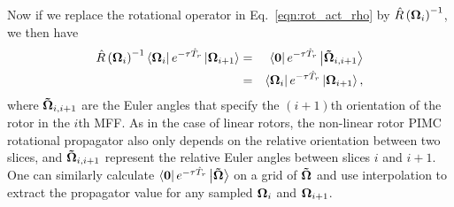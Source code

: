 \documentclass[12pt]{iopart}
\begin{document}
Now if we replace the rotational operator in Eq.~\ref{eqn:rot_act_rho} by $\hat{R}\left({{\bf \Omega}_i}\right)^{-1}$, we then  have
\begin{eqnarray}
\hat{R}\left({{\bf \Omega}_i}\right)^{-1}\left<{\bf \Omega}_i\right| e^{ -\tau\hat{T}_r }\left| {\bf \Omega}_{i+1} \right>&=&\left<{\bf 0}\right| e^{ -\tau\hat{T}_r }\left| {\bf \tilde{\Omega}}_{i,i+1} \right>\nonumber\\
&=&\left<{\bf \Omega}_i\right| e^{ -\tau\hat{T}_r }\left| {\bf \Omega}_{i+1} \right>,
\end{eqnarray}
where ${\bf \tilde{\Omega}}_{i,i+1}$ are the Euler angles that specify the $\left(i+1\right)$th orientation of the rotor in the $i$th MFF. 
As in the case of linear rotors, the non-linear rotor PIMC rotational propagator also only depends on the relative orientation between two slices, and ${\bf \tilde{\Omega}}_{i,i+1}$ represent the relative Euler angles between slices $i$ and $i+1$. One can similarly calculate
$\left<{\bf 0}\right| e^{ -\tau\hat{T}_r }\left| {\bf \tilde{\Omega}} \right>$
on a grid of ${\bf \tilde{\Omega}}$ and use interpolation to extract the propagator value for any sampled ${\bf \Omega}_i$ and ${\bf \Omega}_{i+1}$.
\end{document}

